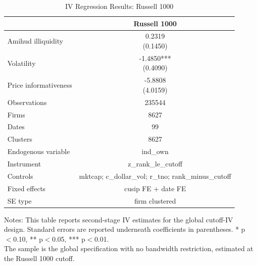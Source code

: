 \begin{table}[!htbp]\centering
\caption{IV Regression Results: Russell 1000}
\label{tab:iv_global_results_r1000}
\begin{threeparttable}
\footnotesize
\setlength{\tabcolsep}{3.5pt}
\renewcommand{\arraystretch}{1.05}
\begin{tabular}{lc}
\toprule
 & Russell 1000 \\
\midrule
Amihud illiquidity & \shortstack{0.2319\\(0.1450)} \\
Volatility & \shortstack{-1.4850***\\(0.4090)} \\
Price informativeness & \shortstack{-5.8808\\(4.0159)} \\
\midrule
Observations & 235544 \\
Firms & 8627 \\
Dates & 99 \\
Clusters & 8627 \\
Endogenous variable & ind_own \\
Instrument & z_rank_le_cutoff \\
Controls & mktcap; c_dollar_vol; r_tno; rank_minus_cutoff \\
Fixed effects & cusip FE + date FE \\
SE type & firm clustered \\
\bottomrule
\end{tabular}
\vspace{0.35em}
\noindent\parbox{\textwidth}{\footnotesize
Notes: This table reports second-stage IV estimates for the global cutoff-IV design. Standard errors are reported underneath coefficients in parentheses. * p$<$0.10, ** p$<$0.05, *** p$<$0.01.\\
The sample is the global specification with no bandwidth restriction, estimated at the Russell 1000 cutoff.
}
\end{threeparttable}
\end{table}

